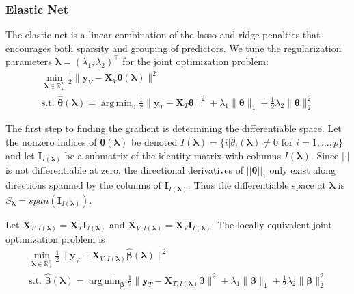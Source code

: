 \documentclass[12pt]{article}
\DeclareMathOperator*{\argmin}{arg\,min}
\begin{document}
\subsubsection{Elastic Net}\label{sec:enet}

The elastic net \citep{zou2003regression} is a linear combination of the lasso and ridge penalties that encourages both sparsity and grouping of predictors. We tune the regularization parameters $\boldsymbol{\lambda} = (\lambda_1, \lambda_2)^\top$ for the joint optimization problem:
\begin{equation}
\begin{array}{c}
\min_{\boldsymbol{\lambda} \in \mathbb{R}^2_{+}} \frac{1}{2} \| \boldsymbol{y}_V - \boldsymbol{X}_V \hat{\boldsymbol{\theta}} (\boldsymbol \lambda) \| ^2 \\
\text{s.t. }
\hat{\boldsymbol{\theta}} (\boldsymbol{\lambda}) = \argmin_{\boldsymbol{\theta}} \frac{1}{2} \| \boldsymbol{y}_T - \boldsymbol{X}_T \boldsymbol{\theta} \| ^2
+ \lambda_1 \| \boldsymbol{\theta} \|_1
+ \frac{1}{2}\lambda_2 \| \boldsymbol{\theta} \|_2^2
\end{array}
\end{equation}

The first step to finding the gradient is determining the differentiable space. Let the nonzero indices of $\hat{\boldsymbol{\theta}}(\boldsymbol{\lambda})$ be denoted $I(\boldsymbol\lambda) = \{i | \hat{\theta}_i(\boldsymbol\lambda) \ne 0 \text{ for } i=1,...,p \}$ and let $\boldsymbol I_{I(\boldsymbol \lambda)}$ be a submatrix of the identity matrix with columns $I(\boldsymbol\lambda)$. Since $|\cdot|$ is not differentiable at zero, the directional derivatives of $||\boldsymbol \theta||_1$ only exist along directions spanned by the columns of $\boldsymbol I_{I(\boldsymbol \lambda)}$. Thus the differentiable space at $\boldsymbol \lambda$ is
$
S_{\boldsymbol{\lambda}} = span(\boldsymbol I_{I(\boldsymbol \lambda)})
\label{eq:en_diff_space}
$.

Let $\boldsymbol{X}_{T, I(\boldsymbol\lambda)} = \boldsymbol{X}_T \boldsymbol{I}_{I(\boldsymbol \lambda)}$ and $\boldsymbol{X}_{V, I(\boldsymbol\lambda)}  = \boldsymbol{X}_V \boldsymbol{I}_{I(\boldsymbol \lambda)}$.  The locally equivalent joint optimization problem is
\begin{equation}
\begin{array}{c}
\min_{\boldsymbol{\lambda} \in \mathbb{R}^2_{+}} \frac{1}{2} \| \boldsymbol{y}_V - \boldsymbol{X}_{V, I(\boldsymbol \lambda)} \hat{\boldsymbol{\beta}} (\boldsymbol \lambda) \| ^2 \\
\text{s.t. }
\hat{\boldsymbol{\beta}} (\boldsymbol{\lambda}) = \argmin_{\boldsymbol \beta} \frac{1}{2} \| \boldsymbol{y}_T - \boldsymbol{X}_{T, I(\boldsymbol \lambda)} \boldsymbol \beta \| ^2
+ \lambda_1 \| \boldsymbol \beta \|_1
+ \frac{1}{2}\lambda_2 \| \boldsymbol \beta \|_2^2
\end{array}
\end{equation}
\end{document}

